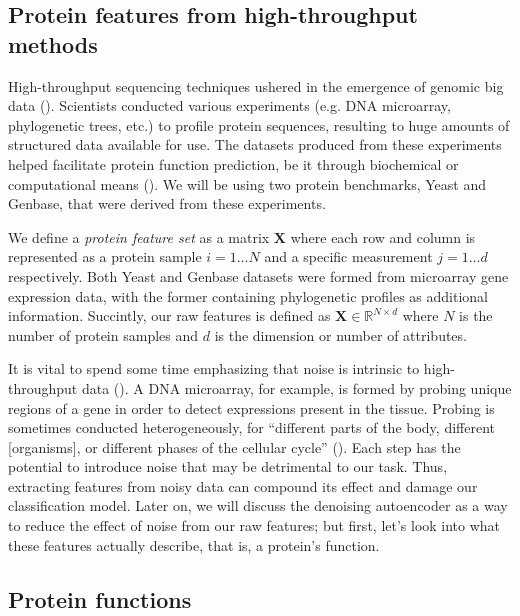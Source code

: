 \subsection{Protein features from high-throughput methods}

\par High-throughput sequencing techniques ushered in the emergence of
genomic big data (\cite{reuter2015high}). Scientists conducted various
experiments (e.g. DNA microarray, phylogenetic trees, etc.) to profile
protein sequences, resulting to huge amounts of structured data available for
use. The datasets produced from these experiments helped facilitate protein
function prediction, be it through biochemical or computational means
(\cite{eisenberg2000protein, marcotte1999combined}). We will be using two
protein benchmarks, Yeast and Genbase, that were derived from these
experiments.

\par We define a \textit{protein feature set} as a matrix $\mathbf{X}$ where
each row and column is represented as a protein sample $i=1\dots N$ and a
specific measurement $j=1\dots d$ respectively. Both Yeast and Genbase
datasets were formed from microarray gene expression data, with the former
containing phylogenetic profiles as additional information. Succintly, our
raw features is defined as $\mathbf{X} \in \mathbb{R}^{N \times d}$ where $N$
is the number of protein samples and $d$ is the dimension or number of
attributes.

\par It is vital to spend some time emphasizing that noise is intrinsic to
high-throughput data (\cite{hong2013estimating}). A DNA microarray, for
example, is formed by probing unique regions of a gene in order to detect
expressions present in the tissue. Probing is sometimes conducted
heterogeneously, for ``different parts of the body, different [organisms], or
different phases of the cellular cycle'' (\cite{nguyen2009noise}). Each step
has the potential to introduce noise that may be detrimental to our task.
Thus, extracting features from noisy data can compound its effect and damage
our classification model. Later on, we will discuss the denoising autoencoder
as a way to reduce the effect of noise from our raw features; but first, let's
look into what these features actually describe, that is, a protein's
function.

\subsection{Protein functions}

